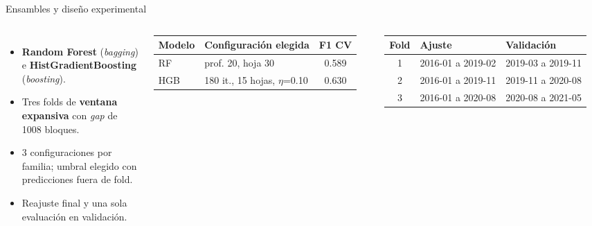 \documentclass[aspectratio=169,11pt]{beamer}
\begin{document}
\begin{frame}{Ensambles y diseño experimental}
\begin{columns}[T]
\small
\begin{itemize}
\item \textbf{Random Forest} (\textit{bagging}) e \textbf{HistGradientBoosting} (\textit{boosting}).
\item Tres folds de \textbf{ventana expansiva} con \textit{gap} de 1008 bloques.
\item 3 configuraciones por familia; umbral elegido con predicciones fuera de fold.
\item Reajuste final y una sola evaluación en validación.
\end{itemize}
\footnotesize
\begin{tabular}{llc}
\toprule
Modelo & Configuración elegida & F1 CV \\
\midrule
RF & prof. 20, hoja 30 & 0.589 \\
HGB & 180 it., 15 hojas, $\eta$=0.10 & 0.630 \\
\bottomrule
\end{tabular}
\vspace{0.3cm}

\begin{tabular}{cll}
\toprule
Fold & Ajuste & Validación \\
\midrule
1 & 2016-01 a 2019-02 & 2019-03 a 2019-11 \\
2 & 2016-01 a 2019-11 & 2019-11 a 2020-08 \\
3 & 2016-01 a 2020-08 & 2020-08 a 2021-05 \\
\bottomrule
\end{tabular}
\end{columns}
\end{frame}
\end{document}
